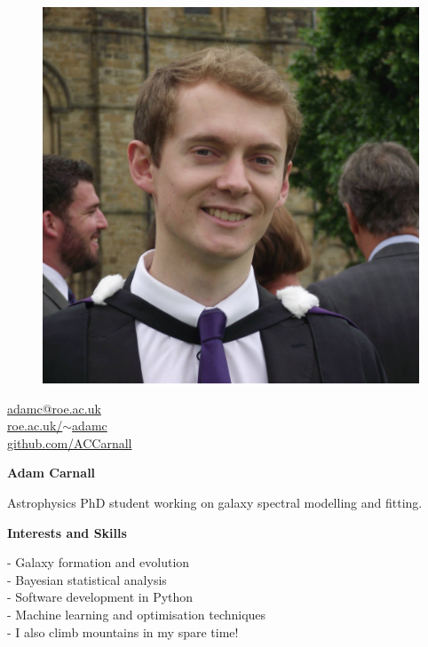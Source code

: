 \documentclass[a4paper,11pt,final]{memoir}
\newcommand{\Sep}{\vspace{1.5em}}
\newcommand{\SmallSep}{\vspace{0.5em}}
\newcommand{\CVSection}[1]
	{\Large\textbf{#1}\par
	\SmallSep\normalsize\normalfont}
\begin{document}
\begin{figure}
	\hfill
	\includegraphics[width=\columnwidth]{graduation.jpg}
	\vspace{-8cm}
\end{figure}

\begin{flushright}\small
	\href{adamc@roe.ac.uk}{adamc@roe.ac.uk}  \\
	\SmallSep
	\href{https://www.roe.ac.uk/~adamc}{roe.ac.uk/$\sim$adamc} \\
	\SmallSep
	\href{https://www.github.com/ACCarnall}{github.com/ACCarnall} \\
\end{flushright}\normalsize
\framebreak


\Huge\bfseries {\color{RoyalBlue} Adam Carnall} \\
\normalsize\normalfont

Astrophysics PhD student working on galaxy spectral modelling and fitting.

\Sep

\CVSection{Interests and Skills}

 - Galaxy formation and evolution\\
 - Bayesian statistical analysis\\
 - Software development in Python\\
 - Machine learning and optimisation techniques\\
 - I also climb mountains in my spare time!
\end{document}
